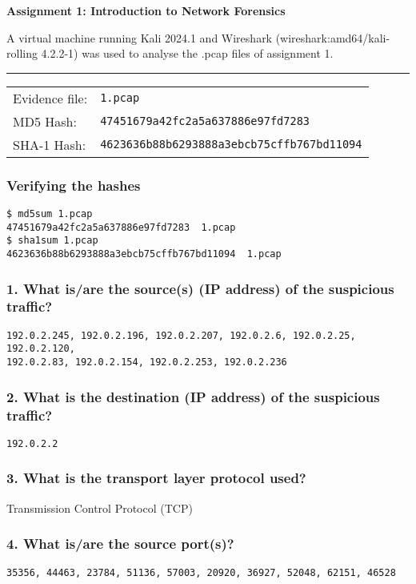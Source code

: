 \centerline{\LARGE{\textbf{Assignment 1: Introduction to Network Forensics}}}
\vspace{1cm}
\noindent A virtual machine running Kali 2024.1 and Wireshark (wireshark:amd64/kali-rolling 4.2.2-1) was used to analyse the .pcap files of assignment 1.

\noindent\rule{\textwidth}{1pt}
\vspace{-0.8cm}
\begin{table}[h]
\begin{tabular}{ll}
Evidence file: & \texttt{1.pcap}                                 \\
MD5 Hash:      & \texttt{47451679a42fc2a5a637886e97fd7283}         \\
SHA-1 Hash:    & \texttt{4623636b88b6293888a3ebcb75cffb767bd11094}
\end{tabular}
\end{table}
\vspace{-0.8cm}
\subsubsection*{Verifying the hashes}
\begin{verbatim}
$ md5sum 1.pcap         
47451679a42fc2a5a637886e97fd7283  1.pcap
$ sha1sum 1.pcap   
4623636b88b6293888a3ebcb75cffb767bd11094  1.pcap
\end{verbatim}
\subsubsection*{1. What is/are the source(s) (IP address) of the suspicious traffic?}
\texttt{192.0.2.245, 192.0.2.196, 192.0.2.207, 192.0.2.6, 192.0.2.25, 192.0.2.120, \\192.0.2.83, 192.0.2.154, 192.0.2.253, 192.0.2.236}
\subsubsection*{2. What is the destination (IP address) of the suspicious traffic?}
\texttt{192.0.2.2}
\subsubsection*{3. What is the transport layer protocol used?}
Transmission Control Protocol (TCP)
\subsubsection*{4. What is/are the source port(s)?}
\texttt{35356, 44463, 23784, 51136, 57003, 20920, 36927, 52048, 62151, 46528}
